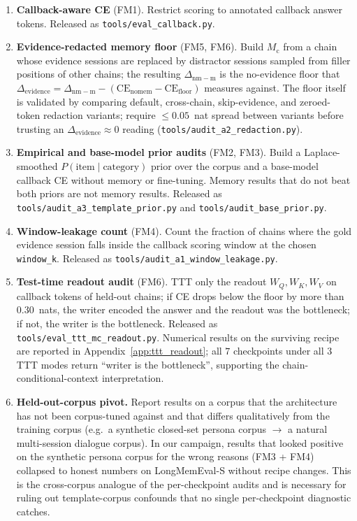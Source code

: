 \documentclass{article}
\newcommand{\Mc}{M_{\mathrm{c}}}
\newcommand{\dnm}{\Delta_{\mathrm{nm-m}}}
\newcommand{\CEnomem}{\mathrm{CE}_{\mathrm{nomem}}}
\newcommand{\CEfloor}{\mathrm{CE}_{\mathrm{floor}}}
\newcommand{\elift}{\Delta_{\mathrm{evidence}}}
\begin{document}
\begin{enumerate}\setlength{\itemsep}{0.5pt}
\item \textbf{Callback-aware CE} (FM1).  Restrict scoring to
annotated callback answer tokens.  Released as
\texttt{tools/eval\_callback.py}.
\item \textbf{Evidence-redacted memory floor} (FM5, FM6).  Build
$\Mc$ from a chain whose evidence sessions are replaced by
distractor sessions sampled from filler positions of other chains;
the resulting $\dnm$ is the no-evidence floor that
$\elift = \dnm - (\CEnomem - \CEfloor)$ measures against.  The floor
itself is validated by comparing default, cross-chain,
skip-evidence, and zeroed-token redaction variants; require
$\le 0.05$~nat spread between variants before trusting an
$\elift \approx 0$ reading
(\texttt{tools/audit\_a2\_redaction.py}).
\item \textbf{Empirical and base-model prior audits} (FM2, FM3).
Build a Laplace-smoothed $P(\text{item}\mid\text{category})$ prior
over the corpus and a base-model callback CE without memory or
fine-tuning.  Memory results that do not beat both priors are not
memory results.  Released as
\texttt{tools/audit\_a3\_template\_prior.py} and
\texttt{tools/audit\_base\_prior.py}.
\item \textbf{Window-leakage count} (FM4).  Count the fraction of
chains where the gold evidence session falls inside the callback
scoring window at the chosen \texttt{window\_k}.  Released as
\texttt{tools/audit\_a1\_window\_leakage.py}.
\item \textbf{Test-time readout audit} (FM6).  TTT only the readout
$W_Q,W_K,W_V$ on callback tokens of held-out chains; if CE drops
below the floor by more than $0.30$~nats, the writer encoded the
answer and the readout was the bottleneck; if not, the writer is
the bottleneck.  Released as
\texttt{tools/eval\_ttt\_mc\_readout.py}.  Numerical results on the
surviving recipe are reported in Appendix~\ref{app:ttt_readout};
all $7$ checkpoints under all $3$ TTT modes return ``writer is the
bottleneck'', supporting the chain-conditional-context
interpretation.
\item \textbf{Held-out-corpus pivot.}  Report results on a corpus
that the architecture has not been corpus-tuned against and that
differs qualitatively from the training corpus (e.g.\ a synthetic
closed-set persona corpus $\to$ a natural multi-session dialogue
corpus).  In our campaign, results that looked positive on the
synthetic persona corpus for the wrong reasons (FM3 + FM4)
collapsed to honest numbers on LongMemEval-S without recipe changes.
This is the cross-corpus analogue of the per-checkpoint audits and
is necessary for ruling out template-corpus confounds that no single
per-checkpoint diagnostic catches.
\end{enumerate}
\end{document}
